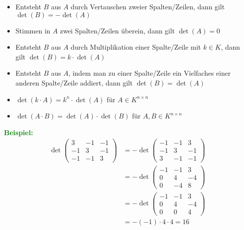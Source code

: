 \documentclass{article}
\newcommand{\green}[1]{\textcolor{green}{#1}}
\newcommand{\ex}{\green{\textbf{Beispiel: }}}
\begin{document}
\begin{itemize}
    \item Entsteht $B$ aus $A$ durch Vertauschen zweier Spalten/Zeilen, dann gilt $\det(B) = -\det(A)$
    \item Stimmen in $A$ zwei Spalten/Zeilen überein, dann gilt $\det(A) = 0$
    \item Entsteht $B$ aus $A$ durch Multiplikation einer Spalte/Zeile mit $k \in K$, dann gilt $\det(B) = k \cdot \det(A)$
    \item Entsteht $B$ aus $A$, indem man zu einer Spalte/Zeile ein Vielfaches einer anderen Spalte/Zeile addiert, dann gilt $\det(B) = \det(A)$
    \item $\det(k \cdot A) = k^n \cdot \det(A)$ für $A \in K^{n \times n}$
    \item $\det(A \cdot B) = \det(A) \cdot \det(B)$ für $A,B \in K^{n \times n}$
\end{itemize}

\ex \begin{align*}
    \det \begin{pmatrix}
        3 & -1 & -1\\
        -1 & 3 & -1\\
        -1 & -1 & 3
    \end{pmatrix} &= - \det \begin{pmatrix}
        -1 & -1 & 3\\
        -1 & 3 & -1\\
        3 & -1 & -1
    \end{pmatrix}\\
    &= - \det \begin{pmatrix}
        -1 & -1 & 3\\
        0 & 4 & -4\\
        0 & -4 & 8
    \end{pmatrix}\\
    &= - \det \begin{pmatrix}
        -1 & -1 & 3\\
        0 & 4 & -4\\
        0 & 0 & 4
    \end{pmatrix}\\
    &= - (-1) \cdot 4 \cdot 4 = 16
\end{align*}
\end{document}
